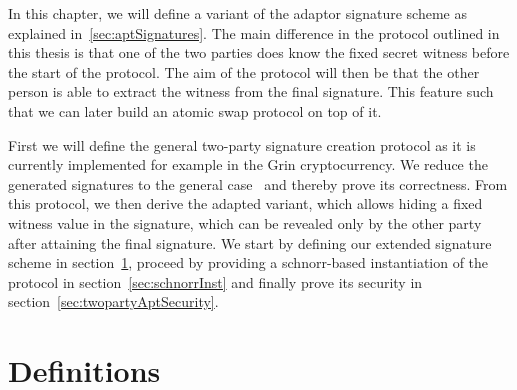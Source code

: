 In this chapter, we will define a variant of the adaptor signature scheme as explained in~\ref{sec:aptSignatures}. The main difference in the protocol outlined in this thesis is that one of the two parties does know the fixed secret witness before the start of the protocol. The aim of the protocol will then be that the other person is able to extract the witness from the final signature. This feature such that we can later build an atomic swap protocol on top of it.  

First we will define the general two-party signature creation protocol as it is currently implemented for example in the Grin cryptocurrency.
We reduce the generated signatures to the general case~\cite{schnorr1989efficient} and thereby prove its correctness.
From this protocol, we then derive the adapted variant, which allows hiding a fixed witness
value in the signature, which can be revealed only by the other party after attaining the final signature.
We start by defining our extended signature scheme in section~\ref{sec:definitions}, proceed by providing a schnorr-based instantiation of the protocol in section~\ref{sec:schnorrInst} and finally prove its security in section~\ref{sec:twopartyAptSecurity}.

\section{Definitions}\label{sec:definitions}

